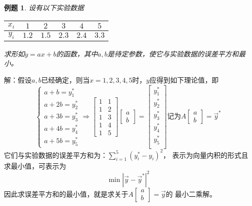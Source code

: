 \documentclass[a4paper]{book}
\newtheorem{eg}{例题}[chapter]
\begin{document}
\begin{eg}
设有以下实验数据
\begin{table}[H]
\centering
\begin{tabular}{cccccc}
  \hline
   $x_i$ & $1$ & $2$ & $3$ & $4$ & $5$ \\
   \hline
   $y_i$ & $1.2$ & $1.5$ & $2.3$ & $2.4$ & $3.3$ \\
  \hline
\end{tabular}
\end{table}
求形如$y=ax+b$的函数，其中$a,b$是待定参数，使它与实验数据的误差平方和最小。
\end{eg}
解：假设$a,b$已经确定，则当$x=1,2,3,4,5$时，$y$应得到如下理论值，即
\begin{equation*}
\begin{cases}
a+b=y_1^*\\
a+2b=y_2^*\\
a+3b=y_3^*\\
a+4b=y_4^*\\
a+5b=y_5^*
\end{cases}
\Rightarrow
\begin{bmatrix}
1&1\\1&2\\1&3\\1&4\\1&5
\end{bmatrix}
\begin{bmatrix}
a\\b
\end{bmatrix}
=\begin{bmatrix}y_1^*\\y_2^*\\y_3^*\\y_4^*\\y_5^*\\\end{bmatrix}
\text{记为}
A\begin{bmatrix}
a\\b
\end{bmatrix}
=\vec{y}^*
\end{equation*}
它们与实验数据的误差平方和为：$\sum_{i=1}^5(y_i^*-y_i)^2$，
表示为向量内积的形式且求最小值，可表示为
\begin{equation*}
\min|\vec{y}-\vec{y}^*|^2
\end{equation*}
因此求误差平方和的最小值，就是求关于$A\begin{bmatrix}a\\b\end{bmatrix}=\vec{y}$的
最小二乘解。\\
\end{document}
